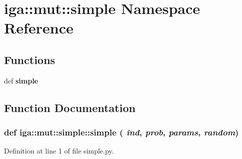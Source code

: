 \section{iga::mut::simple Namespace Reference}
\label{namespaceiga_1_1mut_1_1simple}


\subsection*{Functions}
\begin{CompactItemize}
\item 
def {\bf simple}
\end{CompactItemize}


\subsection{Function Documentation}
\subsubsection{\setlength{\rightskip}{0pt plus 5cm}def iga::mut::simple::simple ( {\em ind},  {\em prob},  {\em params},  {\em random})}\label{namespaceiga_1_1mut_1_1simple_daa23df43a307b0ae7194f9c0538432f}




Definition at line 1 of file simple.py.